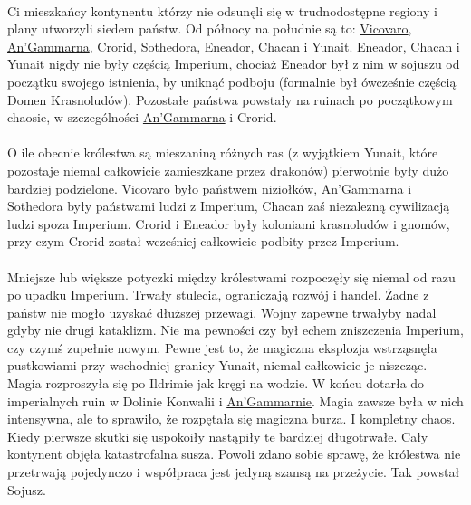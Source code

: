\paragraph{}
Ci mieszkańcy kontynentu którzy nie odsunęli się w trudnodostępne regiony i plany utworzyli siedem państw.
Od północy na południe są to: \hyperref[Vicovaro]{Vicovaro}, \hyperref[AnGammarna]{An’Gammarna}, Crorid, Sothedora, Eneador, Chacan i Yunait.
Eneador, Chacan i Yunait nigdy nie były częścią Imperium, chociaż Eneador był z nim w sojuszu od początku swojego istnienia, by uniknąć podboju (formalnie był ówcześnie częścią Domen Krasnoludów).
Pozostałe państwa powstały na ruinach po początkowym chaosie, w szczególności \hyperref[AnGammarna]{An’Gammarna} i Crorid.

\paragraph{}
O ile obecnie królestwa są mieszaniną różnych ras (z wyjątkiem Yunait, które pozostaje niemal całkowicie zamieszkane przez drakonów) pierwotnie były dużo bardziej podzielone.
\hyperref[Vicovaro]{Vicovaro} było państwem niziołków, \hyperref[AnGammarna]{An'Gammarna} i Sothedora były państwami ludzi z Imperium, Chacan zaś niezalezną cywilizacją ludzi spoza Imperium.
Crorid i Eneador były koloniami krasnoludów i gnomów, przy czym Crorid został wcześniej całkowicie podbity przez Imperium.

\paragraph{}
Mniejsze lub większe potyczki między królestwami rozpoczęły się niemal od razu po upadku Imperium.
Trwały stulecia, ograniczają rozwój i handel.
Żadne z państw nie mogło uzyskać dłuższej przewagi.
Wojny zapewne trwałyby nadal gdyby nie drugi kataklizm.
Nie ma pewności czy był echem zniszczenia Imperium, czy czymś zupełnie nowym.
Pewne jest to, że magiczna eksplozja wstrząsnęła pustkowiami przy wschodniej granicy Yunait, niemal całkowicie je niszcząc. 
Magia rozproszyła się po Ildrimie jak kręgi na wodzie.
W końcu dotarła do imperialnych ruin w Dolinie Konwalii i \hyperref[AnGammarna]{An’Gammarnie}.
Magia zawsze była w nich intensywna, ale to sprawiło, że rozpętała się magiczna burza.
I kompletny chaos.
Kiedy pierwsze skutki się uspokoiły nastąpiły te bardziej długotrwałe.
Cały kontynent objęła katastrofalna susza.
Powoli zdano sobie sprawę, że królestwa nie przetrwają pojedynczo i współpraca jest jedyną szansą na przeżycie.
Tak powstał Sojusz.

